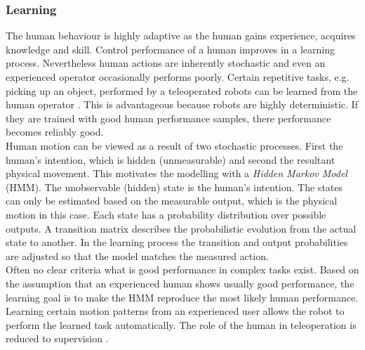 \documentclass[a4paper,twoside, openright,12pt]{report}
\begin{document}
\subsubsection{Learning}
The human behaviour is highly adaptive as the human gains experience, acquires knowledge and skill. Control performance of a human improves in a learning process. Nevertheless human actions are inherently stochastic and even an experienced operator occasionally performs poorly. Certain repetitive tasks, e.g. picking up an object, performed by a teleoperated robots can be learned from the human operator \cite{Yang1994}. This is advantageous because robots are highly deterministic. If they are trained with good human performance samples, there performance becomes reliably good.\\
Human motion can be viewed as a result of two stochastic processes. First the human's intention, which is hidden (unmeasurable) and second the resultant physical movement. This motivates the modelling with a \emph{Hidden Markov Model} (HMM). The unobservable (hidden) state is the human's intention. The states can only be estimated based on the measurable output, which is the physical motion in this case. Each state has a probability distribution over possible outputs. A transition matrix describes the probabilistic evolution from the actual state to another. In the learning process the transition and output probabilities are adjusted so that the model matches the measured action. \\
Often no clear criteria what is good performance in complex tasks exist. Based on the assumption that an experienced human shows usually good performance, the learning goal is to make the HMM reproduce the most likely human performance.\\
Learning certain motion patterns from an experienced user allows the robot to perform the learned task automatically. The role of the human in teleoperation is reduced to supervision \cite{Yang1994}. 
\end{document}
